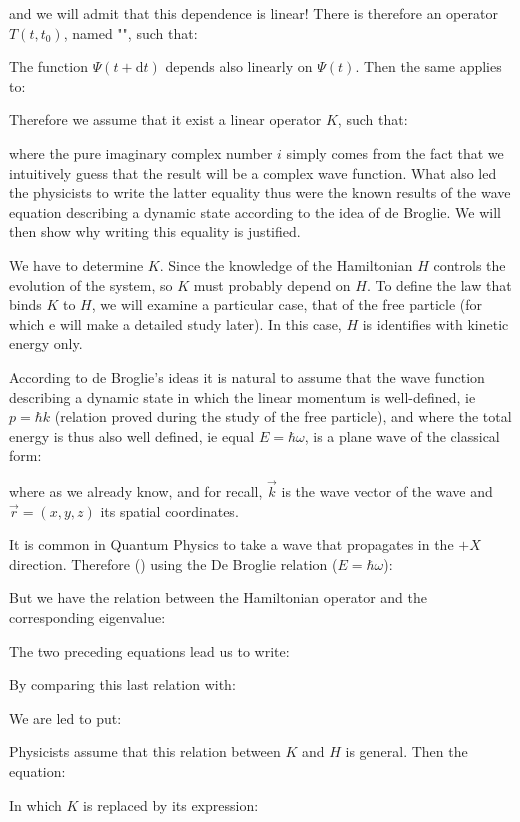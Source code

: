 	and we will admit that this dependence is linear! There is therefore an operator $T(t,t_0)$, named "", such that:
	
	The function $\Psi(t+\mathrm{d}t)$ depends also linearly on $\Psi(t)$. Then the same applies to:
	
	Therefore we assume that it exist a linear operator $K$, such that:
	
	where the pure imaginary complex number $i$ simply comes from the fact that we intuitively guess that the result will be a complex wave function. What also led the physicists to write the latter equality thus were the known results of the wave equation describing a dynamic state according to the idea of de Broglie. We will then show why writing this equality is justified.
	
	We have to determine $K$. Since the knowledge of the Hamiltonian $H$ controls the evolution of the system, so $K$ must probably depend on $H$. To define the law that binds $K$ to $H$, we will examine a particular case, that of the free particle (for which e will make a detailed study later). In this case, $H$ is identifies with kinetic energy only.
	
	According to de Broglie's ideas it is natural to assume that the wave function describing a dynamic state in which the linear momentum is well-defined, ie $p=\hbar k$ (relation proved during the study of the free particle), and where the total energy is thus also well defined, ie equal $E=\hbar\omega$, is a plane wave of the classical form:
	
	where as we already know, and for recall, $\vec{k}$ is the wave vector of the wave and $\vec{r}=(x,y,z)$ its spatial coordinates.
	
	It is common in Quantum Physics to take a wave that propagates in the $+X$ direction. Therefore () using the De Broglie relation ($E=\hbar \omega$):
	
	But we have the relation between the Hamiltonian operator and the corresponding eigenvalue:
	
	The two preceding equations lead us to write:
	
	By comparing this last relation with:
	
	We are led to put:
	
	Physicists assume that this relation between $K$ and $H$ is general. Then the equation:
	
	In which $K$ is replaced by its expression:
	
